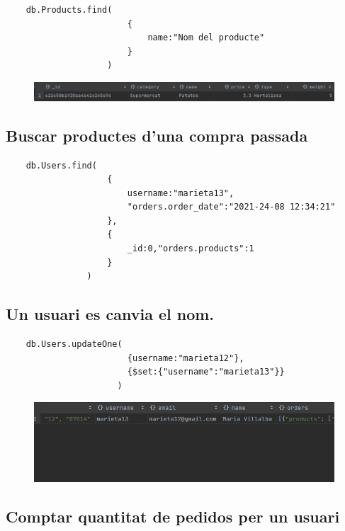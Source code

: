 \begin{verbatim}
    db.Products.find(
                        {
                            name:"Nom del producte"
                        }
                    )
\end{verbatim}

\begin{figure}[htpb!]
    \centering
    \includegraphics[width=400pt]{figures/Buscar productes.png}
\end{figure}

\subsection{Buscar productes d'una compra passada}

\begin{verbatim}
    db.Users.find(
                    {
                        username:"marieta13",
                        "orders.order_date":"2021-24-08 12:34:21"
                    },
                    {
                        _id:0,"orders.products":1
                    }
                )
\end{verbatim}

\newpage

\subsection{Un usuari es canvia el nom.}

\begin{verbatim}
    db.Users.updateOne(
                        {username:"marieta12"},
                        {$set:{"username":"marieta13"}}
                      )
\end{verbatim}

\begin{figure}[htpb!]
    \centering
    \includegraphics[width=400pt]{figures/maria.png}
\end{figure}

\subsection{Comptar quantitat de pedidos per un usuari}

